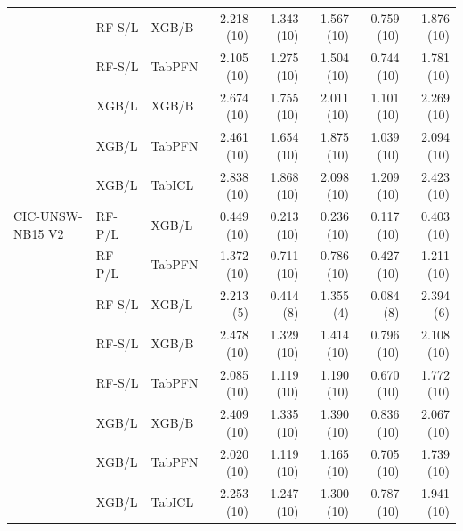 \begin{tabular}{@{}lllrrrrr@{}}
 & RF-S/L & XGB/B & 2.218 (10) & 1.343 (10) & 1.567 (10) & 0.759 (10) & 1.876 (10) \\
 & RF-S/L & TabPFN & 2.105 (10) & 1.275 (10) & 1.504 (10) & 0.744 (10) & 1.781 (10) \\
 & XGB/L & XGB/B & 2.674 (10) & 1.755 (10) & 2.011 (10) & 1.101 (10) & 2.269 (10) \\
 & XGB/L & TabPFN & 2.461 (10) & 1.654 (10) & 1.875 (10) & 1.039 (10) & 2.094 (10) \\
 & XGB/L & TabICL & 2.838 (10) & 1.868 (10) & 2.098 (10) & 1.209 (10) & 2.423 (10) \\
\addlinespace
CIC-UNSW-NB15 V2 & RF-P/L & XGB/L & 0.449 (10) & 0.213 (10) & 0.236 (10) & 0.117 (10) & 0.403 (10) \\
 & RF-P/L & TabPFN & 1.372 (10) & 0.711 (10) & 0.786 (10) & 0.427 (10) & 1.211 (10) \\
 & RF-S/L & XGB/L & 2.213 (5) & 0.414 (8) & 1.355 (4) & 0.084 (8) & 2.394 (6) \\
 & RF-S/L & XGB/B & 2.478 (10) & 1.329 (10) & 1.414 (10) & 0.796 (10) & 2.108 (10) \\
 & RF-S/L & TabPFN & 2.085 (10) & 1.119 (10) & 1.190 (10) & 0.670 (10) & 1.772 (10) \\
 & XGB/L & XGB/B & 2.409 (10) & 1.335 (10) & 1.390 (10) & 0.836 (10) & 2.067 (10) \\
 & XGB/L & TabPFN & 2.020 (10) & 1.119 (10) & 1.165 (10) & 0.705 (10) & 1.739 (10) \\
 & XGB/L & TabICL & 2.253 (10) & 1.247 (10) & 1.300 (10) & 0.787 (10) & 1.941 (10) \\
\bottomrule
\end{tabular}

